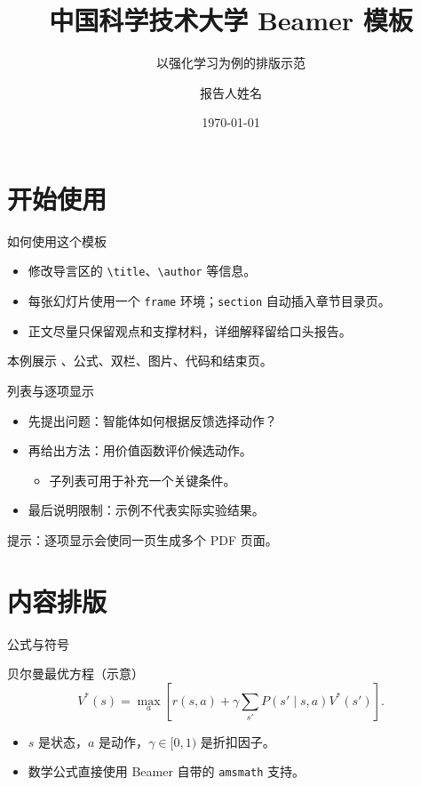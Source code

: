 \documentclass[aspectratio=169]{beamer}
\title{中国科学技术大学 Beamer 模板}
\subtitle{以强化学习为例的排版示范}
\author{报告人姓名}
\date{\today}
\begin{document}
\maketitle

\section{开始使用}

\begin{frame}{如何使用这个模板}
  \begin{itemize}
    \item 修改导言区的 \texttt{\textbackslash title}、\texttt{\textbackslash author} 等信息。
    \item 每张幻灯片使用一个 \texttt{frame} 环境；\texttt{section} 自动插入章节目录页。
    \item 正文尽量只保留观点和支撑材料，详细解释留给口头报告。
  \end{itemize}
  \vspace{0.4cm}
  本例展示 、公式、双栏、图片、代码和结束页。
\end{frame}

\begin{frame}{列表与逐项显示}
  \begin{itemize}[<+->]
    \item 先提出问题：智能体如何根据反馈选择动作？
    \item 再给出方法：用价值函数评价候选动作。
    \begin{itemize}
      \item 子列表可用于补充一个关键条件。
    \end{itemize}
    \item 最后说明限制：示例不代表实际实验结果。
  \end{itemize}
  \vspace{0.3cm}
  \alert{提示：}逐项显示会使同一页生成多个 PDF 页面。
\end{frame}

\section{内容排版}

\begin{frame}{公式与符号}
  \begin{block}{贝尔曼最优方程（示意）}
    \[
      V^*(s)=\max_a\left[r(s,a)+\gamma\sum_{s'}P(s'\mid s,a)V^*(s')\right].
    \]
  \end{block}
  \begin{itemize}
    \item $s$ 是状态，$a$ 是动作，$\gamma\in[0,1)$ 是折扣因子。
    \item 数学公式直接使用 Beamer 自带的 \texttt{amsmath} 支持。
  \end{itemize}
\end{frame}
\end{document}
